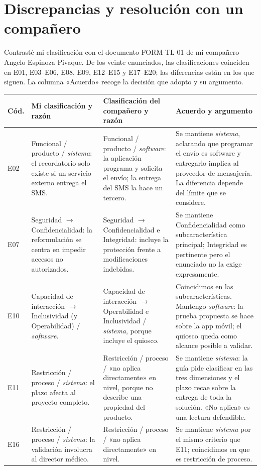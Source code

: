 \documentclass[11pt,a4paper]{article}
\newcommand{\cab}{\rowcolor{gray!18}}
\begin{document}
\section{Discrepancias y resolución con un compañero}
Contrasté mi clasificación con el documento FORM-TL-01 de mi compañero Angelo Espinoza Pivaque. De los veinte enunciados, las clasificaciones coinciden en E01, E03--E06, E08, E09, E12--E15 y E17--E20; las diferencias están en los que siguen. La columna «Acuerdo» recoge la decisión que adopto y su argumento. 

\small
\begin{tabularx}{\textwidth}{@{}p{1.0cm}p{4.2cm}p{4.6cm}Y@{}}
\toprule
\cab\textbf{Cód.} & \textbf{Mi clasificación y razón} & \textbf{Clasificación del compañero y razón} & \textbf{Acuerdo y argumento} \\
\midrule
E02 & Funcional / producto / \emph{sistema}: el recordatorio solo existe si un servicio externo entrega el SMS. & Funcional / producto / \emph{software}: la aplicación programa y solicita el envío; la entrega del SMS la hace un tercero. & Se mantiene \emph{sistema}, aclarando que programar el envío es software y entregarlo implica al proveedor de mensajería. La diferencia depende del límite que se considere.\\
E07 & Seguridad $\rightarrow$ Confidencialidad: la reformulación se centra en impedir accesos no autorizados. & Seguridad $\rightarrow$ Confidencialidad e Integridad: incluye la protección frente a modificaciones indebidas. & Se mantiene Confidencialidad como subcaracterística principal; Integridad es pertinente pero el enunciado no la exige expresamente.\\
E10 & Capacidad de interacción $\rightarrow$ Inclusividad (y Operabilidad) / \emph{software}. & Capacidad de interacción $\rightarrow$ Operabilidad e Inclusividad / \emph{sistema}, porque incluye el quiosco. & Coincidimos en las subcaracterísticas. Mantengo \emph{software}: la prueba propuesta se hace sobre la app móvil; el quiosco queda como alcance posible a validar.\\
E11 & Restricción / proceso / \emph{sistema}: el plazo afecta al proyecto completo. & Restricción / proceso / «no aplica directamente» en nivel, porque no describe una propiedad del producto. & Se mantiene \emph{sistema}: la guía pide clasificar en las tres dimensiones y el plazo recae sobre la entrega de toda la solución. «No aplica» es una lectura defendible.\\
E16 & Restricción / proceso / \emph{sistema}: la validación involucra al director médico. & Restricción / proceso / «no aplica directamente» en nivel. & Se mantiene \emph{sistema} por el mismo criterio que E11; coincidimos en que es restricción de proceso.\\
\bottomrule
\end{tabularx}
\normalsize
\end{document}
